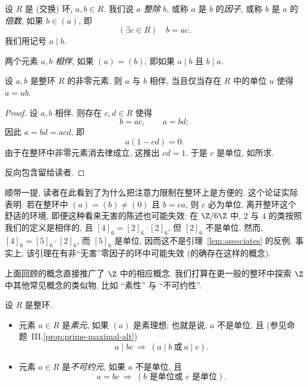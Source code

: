 设 $R$ 是 (交换) 环, $a,b\in R$. 我们说 $a$ \emph{整除} $b$, 或称 $a$ 是 $b$ 的\emph{因子}, 或称 $b$ 是 $a$ 的\emph{倍数}, 如果 $b\in (a)$, 即
\[
(\exists c\in R)\quad b = ac.
\]
我们用记号 $a\mid b$.

两个元素 $a,b$ \emph{相伴}, 如果 $(a) = (b)$, 即如果 $a\mid b$ 且 $b\mid a$.

\begin{lemma}\label{lem:associates}
设 $a,b$ 是整环 $R$ 的非零元素. 则 $a$ 与 $b$ 相伴, 当且仅当存在 $R$ 中的单位 $u$ 使得 $a = ub$.
\end{lemma}

\begin{proof}
设 $a,b$ 相伴. 则存在 $c,d\in R$ 使得
\[
b = ac,\qquad a = bd;
\]
因此 $a = bd = acd$, 即
\[
a(1 - cd) = 0.
\]
由于在整环中非零元素消去律成立, 这推出 $cd = 1$. 于是 $c$ 是单位, 如所求.

反向包含留给读者.
\end{proof}

顺带一提, 读者在此看到了为什么把注意力限制在整环上是方便的. 这个论证实际表明: 若在整环中 $(a)=(b)\neq(0)$ 且 $b=ca$, 则 $c$ 必为单位. 离开整环这个舒适的环境, 即便这种看来无害的陈述也可能失效: 在 $\Z/6\Z$ 中, $2$ 与 $4$ 的类按照我们的定义是相伴的, 且 $[4]_6=[2]_6\cdot[2]_6$, 但 $[2]_6$ 不是单位. 然而, $[4]_6=[5]_6\cdot[2]_6$, 而 $[5]_6$ 是单位, 因而这不是引理~\ref{lem:associates} 的反例. 事实上, 该引理在有非``无害''零因子的环中可能失效 (的确存在这样的概念).

上面回顾的概念直接推广了 $\Z$ 中的相应概念. 我们打算在更一般的整环中探索 $\Z$ 中其他常见概念的类似物, 比如 ``素性'' 与 ``不可约性''.

\begin{definition}\label{def:prime-irreducible}
设 $R$ 是整环.
\begin{itemize}
\item 元素 $a\in R$ 是\emph{素元}, 如果 $(a)$ 是素理想; 也就是说, $a$ 不是单位, 且 (参见命题~III.\ref{prop:prime-maximal-alt})
\[
a\mid bc\ \Rightarrow\ (a\mid b\ \text{或}\ a\mid c).
\]
\item 元素 $a\in R$ 是\emph{不可约元}, 如果 $a$ 不是单位, 且
\[
a = bc\ \Rightarrow\ (b\text{ 是单位或 }c\text{ 是单位}).
\]
\end{itemize}
\end{definition}

